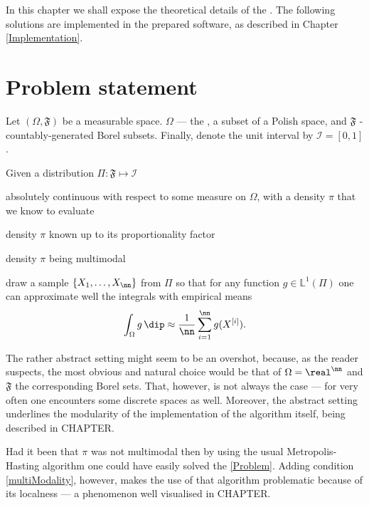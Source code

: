 
In this chapter we shall expose the theoretical details of the \PT. The following solutions are implemented in the prepared software, as described in Chapter \ref{Implementation}. 

\section*{Problem statement}

Let $(\Omega, \mathfrak{F})$ be a measurable space. $\Omega$ --- the \sspace, a subset of a Polish space, and $\mathfrak{F}$ - countably-generated Borel subsets. Finally, denote the unit interval by $\mathcal{I} = [0,1]$. 

\begin{Problem}
	\item{\label{Problem}
		Given a distribution $\Pi: \mathfrak{F} \mapsto \mathcal{I}$
		\begin{Problem}
		 	\item absolutely continuous with respect to some measure on $\Omega$, with a density $\pi$ that we know to evaluate 
		 	\item density $\pi$ known up to its proportionality factor
		 	\item \label{multiModality}density $\pi$ being multimodal
		\end{Problem} 
		draw a sample $\{ X_1, \dots, X_\nn \}$ from $\Pi$ so that for any function $g \in \mathbb{L}^1(\Pi)$ one can approximate well the integrals with empirical means
		$$\int_\Omega g \,\dip \approx \frac{1}{\nn}\sum_{i = 1}^\nn g(X^{[i]}). $$ 
	}
\end{Problem}

The rather abstract setting might seem to be an overshot, because, as the reader suspects, the most obvious and natural choice would be that of $\Omega = \real^\nn$ and $\mathfrak{F}$ the corresponding Borel sets. That, however, is not always the case --- for very often one encounters some discrete spaces as well. Moreover, the abstract setting underlines the modularity of the implementation of the algorithm itself, being described in CHAPTER.

Had it been that $\pi$ was not multimodal then by using the usual Metropolis-Hasting algorithm one could have easily solved the \ref{Problem}. Adding condition \ref{multiModality}, however, makes the use of that algorithm problematic because of its localness --- a phenomenon well visualised in CHAPTER.

